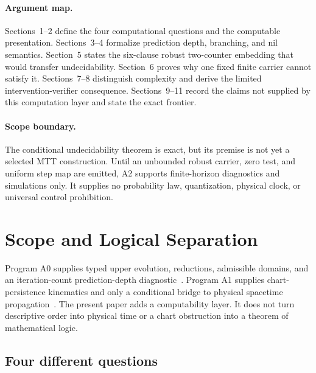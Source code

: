 \documentclass[11pt]{article}
\begin{document}
\paragraph{Argument map.}
Sections~1--2 define the four computational questions and the computable
presentation.  Sections~3--4 formalize prediction depth, branching, and nil
semantics.  Section~5 states the six-clause robust two-counter embedding that
would transfer undecidability.  Section~6 proves why one fixed finite carrier
cannot satisfy it.  Sections~7--8 distinguish complexity and derive the
limited intervention-verifier consequence.  Sections~9--11 record the claims
not supplied by this computation layer and state the exact frontier.

\paragraph{Scope boundary.}
The conditional undecidability theorem is exact, but its premise is not yet a
selected MTT construction.  Until an unbounded robust carrier, zero test, and
uniform step map are emitted, A2 supports finite-horizon diagnostics and
simulations only.  It supplies no probability law, quantization, physical
clock, or universal control prohibition.

\tableofcontents
\newpage

\section{Scope and Logical Separation}

Program A0 supplies typed upper evolution, reductions, admissible domains, and
an iteration-count prediction-depth diagnostic~\cite{A0}.  Program A1 supplies
chart-persistence kinematics and only a conditional bridge to physical
spacetime propagation~\cite{A1}.  The present paper adds a computability layer.
It does not turn descriptive order into physical time or a chart obstruction
into a theorem of mathematical logic.

\subsection{Four different questions}
\end{document}
